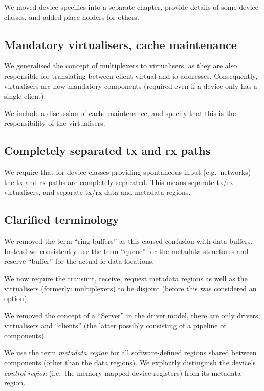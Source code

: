 \documentclass[a4paper,12pt]{report}
\begin{document}
We moved device-specifics into a separate chapter, provide details
of some device classes, and added place-holders for others.

\subsection{Mandatory virtualisers, cache maintenance}

We generalised the concept of multiplexers to virtualisers, as they
are also responsible for translating between client virtual and \gls{io}
addresses. Consequently, virtualisers are now mandatory components
(required even if a device only has a single client).

We include a discussion of cache maintenance, and specify that this is
the responsibility of the virtualisers.

\subsection{Completely separated \gls{tx} and \gls{rx} paths}

We require that for device classes providing spontaneous input (e.g.\
networks) the \gls{tx} and \gls{rx} paths are completely separated. This means
separate \gls{tx}/\gls{rx} virtualisers, and separate \gls{tx}/\gls{rx} data and metadata regions.

\subsection{Clarified terminology}

We removed the term ``ring buffers'' as this caused confusion with
data buffers. Instead we consistently use the term ``queue'' for the
metadata structures and reserve ``buffer'' for the actual \gls{io}-data
locations.

We now require the transmit, receive, request metadata regions as well
as the virtualisers (formerly: multiplexers) to be disjoint (before
this was considered an option).

We removed the concept of a ``Server'' in the driver model, there are
only drivers, virtualisers and ``clients'' (the latter possibly
consisting of a pipeline of components).

We use the term \emph{metadata region} for all software-defined
regions shared between components (other than the data regions). We
explicitly distinguish the device's \emph{control region} (i.e.\ the
memory-mapped device registers) from its metadata region.
\end{document}
